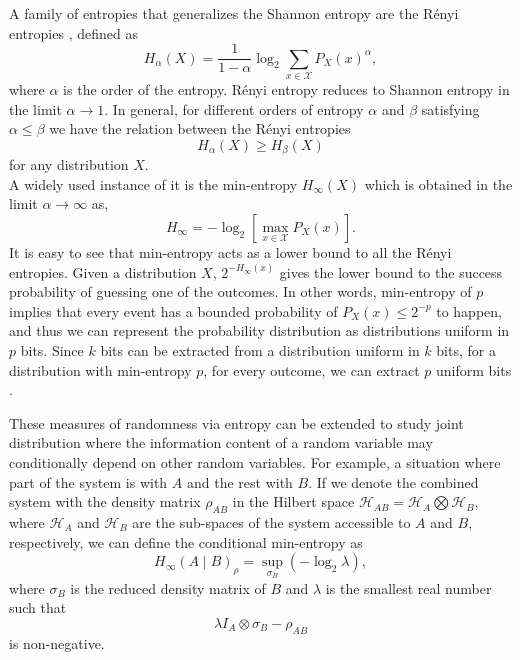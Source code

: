\documentclass[]{interact}
\theoremstyle{plain}%
\theoremstyle{definition}
\theoremstyle{remark}
\begin{document}
A family of entropies that generalizes the Shannon entropy are the R\'enyi entropies \cite{renyi1961measures}, defined as
$$H_\alpha (X)=\frac{1}{1-\alpha}\log _2\sum_{x\in\mathcal{X}}P_X(x)^\alpha,$$
where $\alpha$ is the order of the entropy. R\'enyi entropy reduces to Shannon entropy in the limit $\alpha\rightarrow 1$. In general, for different orders of entropy $\alpha$ and $\beta$ satisfying $\alpha\leq\beta$  we have the relation between the R\'enyi entropies
$$
    H_\alpha(X)\geq H_\beta(X)
$$
for any distribution $X$. \\A widely used instance of it is the min-entropy $H_\infty(X)$ which is obtained in the limit $\alpha\rightarrow\infty$ as,
$$
H_\infty=-\log_2[
\max_{x\in\mathcal{X}}P_X(x)
].
$$
It is easy to see that min-entropy acts as a lower bound to all the R\'enyi entropies. Given a distribution $X$, $2^{-H_\infty(x)}$ gives the lower bound to the success probability of guessing one of the outcomes. In other words, min-entropy of $p$ implies that every event has a  bounded probability of $P_X(x)\leq2^{-p}$ to happen, and thus we can represent the probability distribution as distributions uniform in $p$ bits.    Since $k$ bits can be extracted from a distribution uniform in $k$ bits, for a distribution with min-entropy $p$, {for every outcome}, we can extract $p$ uniform bits \cite{4568168,zuckerman1990general}.


These measures of randomness via entropy can be extended to study joint distribution where the information content of a random variable may conditionally depend on other random variables. For example, a situation where part of the system is with $A$ and the rest with $B$. If we denote the combined system with the density matrix $\rho_{AB}$ in the Hilbert space $\mathscr{H}_{AB}=\mathscr{H}_A\bigotimes \mathscr{H}_B$, where $\mathscr{H}_A$ and $\mathscr{H}_B$ are the sub-spaces of the system accessible to $A$ and $B$, respectively, we can define the conditional min-entropy \cite{https://doi.org/10.3929/ethz-a-005115027} as
$$
    H_{\infty}(A \mid B)_{\rho}=\sup _{\sigma_{B}}\left(-\log _{2} \lambda\right),
$$
where $\sigma_{B}$ is the reduced density matrix of $B$ and $\lambda$ is the smallest real number such that
$$
\lambda I_{A} \otimes \sigma_{B}-\rho_{A B}
$$
is non-negative. 
\end{document}
